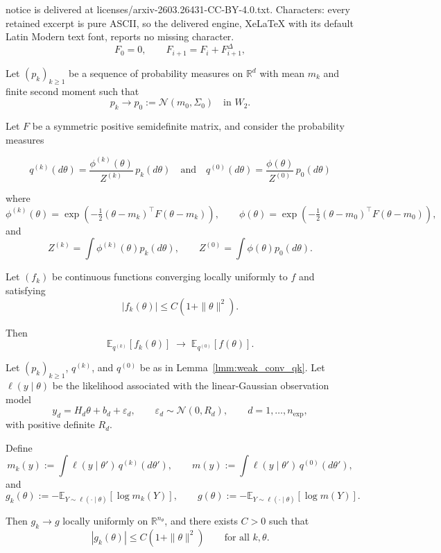 \documentclass[10pt,a4paper]{amsart}
\begin{document}
notice is delivered at licenses/arxiv-2603.26431-CC-BY-4.0.txt. Characters: every retained excerpt is pure ASCII, so the delivered engine, XeLaTeX with its default Latin Modern text font, reports no missing character.
\begin{equation} \label{eq:accumulator_definition}
F_0 = 0,
\qquad
F_{i+1} = F_{i} + F_{i+1}^\Delta,
\end{equation}

\begin{lemma} \label{lmm:weak_conv_qk}
Let $(p_k)_{k\ge1}$ be a sequence of probability measures on $\mathbb{R}^d$  with mean $m_k$ and finite second moment such that
\[
p_k \to p_0 := \mathcal N(m_0,\Sigma_0)
\quad\text{in } W_2.
\]

Let $F$ be a symmetric positive semidefinite matrix, and consider the probability measures 

\[
q^{(k)}(d\theta)
=
\frac{\phi^{(k)}(\theta)}{Z^{(k)}}\,p_k(d\theta)\quad\text{and}\quad
q^{(0)}(d\theta)
=
\frac{\phi(\theta)}{Z^{(0)}}\,p_0(d\theta)
\]


where
\[
\phi^{(k)}(\theta)
=
\exp\!\left(-\tfrac12(\theta-m_k)^\top F (\theta-m_k)\right),
\qquad
\phi(\theta)
=
\exp\!\left(-\tfrac12(\theta-m_0)^\top F (\theta-m_0)\right),
\]
and
\[
Z^{(k)}=\int \phi^{(k)}(\theta)p_k(d\theta),
\qquad
Z^{(0)}=\int \phi(\theta)p_0(d\theta).
\]

Let $(f_k)$ be continuous functions converging locally uniformly to $f$ and satisfying
\[
|f_k(\theta)| \le C(1+\|\theta\|^2).
\]

Then
\[
\mathbb{E}_{q^{(k)}}[f_k(\theta)]
\;\longrightarrow\;
\mathbb{E}_{q^{(0)}}[f(\theta)] .
\]
\end{lemma}

\begin{lemma}\label{lmm:behavior_denom_eig_gauss}
Let $(p_k)_{k\ge1}$, $q^{(k)}$, and $q^{(0)}$ be as in Lemma~\ref{lmm:weak_conv_qk}.
Let \(\ell(y\mid\theta)\) be the likelihood associated with the linear-Gaussian observation model
\[
y_d = H_{d}\theta + b_{d} + \varepsilon_d,
\qquad
\varepsilon_d\sim\mathcal N(0,R_{d}),
\qquad d=1,\dots,n_{\mathrm{exp}},
\]
with positive definite \(R_{d}\).

Define
\[
m_k(y):=\int \ell(y\mid\theta')\,q^{(k)}(d\theta'),
\qquad
m(y):=\int \ell(y\mid\theta')\,q^{(0)}(d\theta'),
\]
and
\[
g_k(\theta):=
-\mathbb{E}_{Y\sim \ell(\cdot\mid\theta)}[\log m_k(Y)],
\qquad
g(\theta):=
-\mathbb{E}_{Y\sim \ell(\cdot\mid\theta)}[\log m(Y)].
\]

Then \(g_k\to g\) locally uniformly on \(\mathbb R^{n_\theta}\), and there exists \(C>0\) such that
\[
|g_k(\theta)|\le C(1+\|\theta\|^2)
\qquad\text{for all }k,\theta.
\]
\end{lemma}
\end{document}
